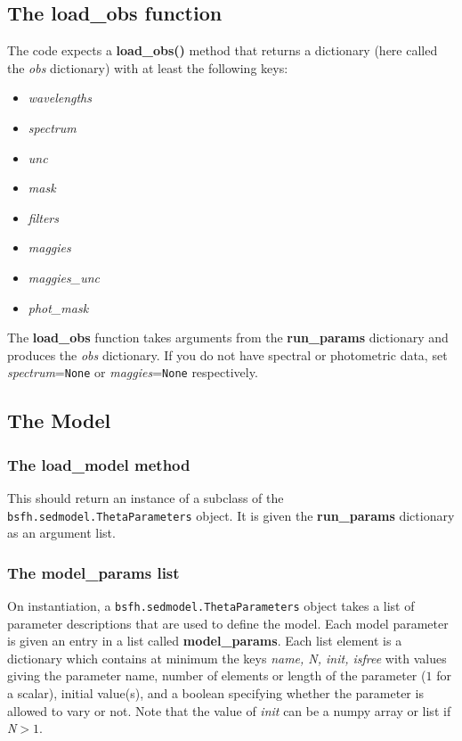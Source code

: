 \documentclass[12pt, letterpaper, preprint]{aastex}
\begin{document}
\subsection{The {\bf load\_obs} function}
The code expects a {\bf load\_obs()} method that returns a dictionary
(here called the {\it obs} dictionary) with at least the following
keys:
\begin{itemize}
\item {\it wavelengths}
\item {\it spectrum}
\item {\it unc}
\item {\it mask}
\item {\it filters}
\item {\it maggies}
\item {\it maggies\_unc}
\item {\it phot\_mask}
\end{itemize}

The {\bf load\_obs} function takes arguments from the {\bf run\_params}
dictionary and produces the {\it obs} dictionary.  If you do not have
spectral or photometric data, set {\it spectrum}=\texttt{None} or
{\it maggies}=\texttt{None} respectively.

\subsection{The Model}

\subsubsection{The {\bf load\_model} method}
This should return an instance of a subclass of the
\texttt{bsfh.sedmodel.ThetaParameters} object.  It is given the {\bf
run\_params} dictionary as an argument list.

\subsubsection{ The {\bf model\_params} list}
On instantiation, a \texttt{bsfh.sedmodel.ThetaParameters} object
takes a list of parameter descriptions that are used to define the
model.  Each model parameter is given an entry in a list called {\bf
model\_params}. Each list element is a dictionary which contains at
minimum the keys {\it name, N, init, isfree} with values giving the
parameter name, number of elements or length of the parameter
($1$ for a scalar), initial value(s), and a boolean specifying
whether the parameter is allowed to vary or not.  Note that the value
of {\it init} can be a numpy array or list if {\it N}$>1$.
\end{document}
